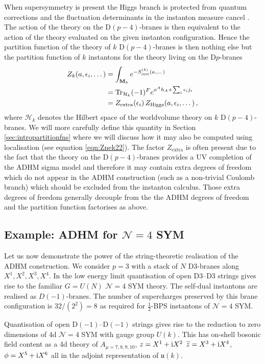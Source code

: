 \documentclass[main.tex]{subfiles}
\begin{document}
When supersymmetry is present the Higgs branch is protected from quantum corrections \cite{Tachikawa:2013kta} and the fluctuation determinants in the instanton measure cancel \cite{Dorey:2000zq,Dorey:2002ik,Vandoren:2008xg}.  The action of the theory on the D$(p-4)$-branes is then equivalent to the action of the theory evaluated on the given instanton configuration.  Hence the partition function of the theory of $k$ D$(p-4)$-branes is then nothing else but the partition function of $k$ instantons for the theory living on the D$p$-branes
\begin{align}\label{eqn:introstringZk}
Z_{k}(a,\epsilon_{i},\dots)&=\int_{\mathbf{M}_{k}}e^{-S^{(k)}_{\text{inst}}(a,\dots)}\\
&=\operatorname{Tr}_{\mathcal{H}_k}(-1)^Fe^{a^Ah_A+\sum_{i}\epsilon_ij_i}\\
&=Z_{\text{extra}}(\epsilon_i)\,Z_{\text{Higgs}}(a,\epsilon_i,\dots)\,,
\end{align}
where $\mathcal{H}_k$ denotes the Hilbert space of the worldvolume theory on $k$ D$(p-4)$-branes.
We will more carefully define this quantity in Section \ref{sec:intropartitionfns} where we will discuss how it may also be computed using localisation (see equation \eqref{eqn:Znek22}).
The factor $Z_{\text{extra}}$ is often present due to the fact that the theory on the D$(p-4)$-branes provides a UV completion of the ADHM sigma model \cite{Hwang:2014uwa,Kim:2012gu} and therefore it may contain extra degrees of freedom which do not appear in the ADHM construction (such as a non-trivial Coulomb branch) which should be excluded from the instanton calculus.  Those extra degrees of freedom generally decouple from the the ADHM degrees of freedom and the partition function factorises as above.

\subsection{Example: ADHM for \texorpdfstring{$\mathcal{N}=4$}{N=4} SYM}
Let us now demonstrate the power of the string-theoretic realisation of the ADHM construction.  We consider $p=3$ with a stack of $N$ D$3$-branes along $X^1,X^2,X^3,X^4$.  In the low energy limit quantisation of open D$3$--D$3$ strings gives rise to the familiar $G=U(N)$ $\mathcal{N}=4$ SYM theory.  The self-dual instantons are realised as $D(-1)$-branes.  The number of supercharges preserved by this brane configuration is $32/(2^2)=8$ as required for $\frac{1}{2}$-BPS instantons of $\mathcal{N}=4$ SYM.  

Quantisation of open D$(-1)$--D$(-1)$ strings gives rise to the reduction to zero dimensions of 4d $\mathcal{N}=4$ SYM with gauge group $U(k)$.  This has on-shell bosonic field content as a 4d theory of $A_{\mu=7,8,9,10}$, $z=X^1+\mathrm{i} X^2$ $\widetilde{z}=X^3+\mathrm{i} X^{4}$, $\phi=X^5+\mathrm{i} X^6$  all in the adjoint representation of $\mathfrak{u}(k)$.
\end{document}
